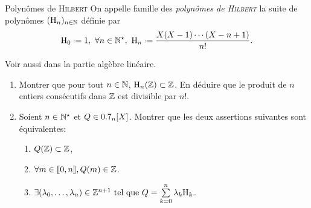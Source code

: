 \begin{defi}{Polynômes de \textsc{Hilbert}}
    On appelle famille des \emph{polynômes de \textsc{Hilbert}} la suite de polynômes $(\mathrm{H}_n)_{n \in \mathbb{N}}$ définie par
    $$\Hilb_0 \defeq 1,\ \forall n \in \Ne,\ \Hilb_n \defeq \frac{X(X-1)\cdots(X-n+1)}{n!}.$$
\end{defi}

Voir aussi  dans la partie algèbre linéaire. 

\begin{exercice}
    \begin{enumerate}
        \item Montrer que pour tout $n \in \mathbb{N}$, $\mathrm{H}_n(\mathbb{Z}) \subset \mathbb{Z}$. En déduire que le produit de $n$ entiers consécutifs dans $\mathbb{Z}$ est divisible par $n!$.
        \item Soient $n \in \mathbb{N}^\star$ et $Q \in 0.7_n[X]$. Montrer que les deux assertions suivantes sont équivalentes:
        \begin{enumerate}[label=(\roman*)]
            \item $Q(\mathbb{Z}) \subset \mathbb{Z}$,
            \item $\forall m \in \llbracket 0, n \rrbracket, Q(m) \in \mathbb{Z}$.
            \item $\exists (\lambda_0, \dots, \lambda_n) \in \mathbb{Z}^{n+1} \text{ tel que } Q = \sum\limits_{k=0}^n \lambda_k \mathrm{H}_k$.
        \end{enumerate}
    \end{enumerate}
\end{exercice}

\begin{solution}
\end{solution}